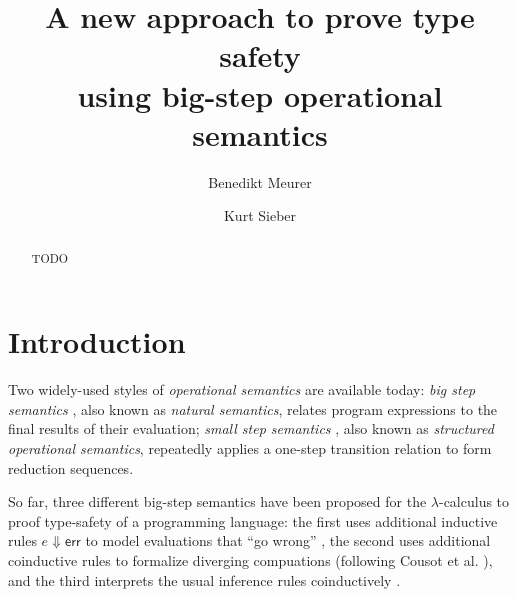 \documentclass[12pt,a2paper,draft]{article}
\begin{document}
\title{%
  A new approach to prove type safety\\using big-step operational semantics
}
\author{Benedikt Meurer}
\author{Kurt Sieber}
\date{}
\maketitle
\begin{abstract}
  TODO
\end{abstract}


\section{Introduction}

Two widely-used styles of \emph{operational semantics} are available today: \emph{big step semantics} \cite{Kahn87},
also known as \emph{natural semantics}, relates program expressions to the final results of their
evaluation; \emph{small step semantics} \cite{Plotkin81,Plotkin04}, also known as
\emph{structured operational semantics}, repeatedly applies a one-step transition relation to
form reduction sequences.

So far, three different big-step semantics have been proposed for the $\lambda$-calculus to
proof type-safety of a programming language: the first uses additional inductive rules
$e \Downarrow \textsf{err}$ to model evaluations that ``go wrong'' \cite{Tofte87}, the second uses
additional coinductive rules to formalize diverging compuations (following Cousot et al.
\cite{CousotCousot07,LeroyGrall09}), and the third interprets the usual inference
rules coinductively \cite{LeroyGrall09}. 
\end{document}
